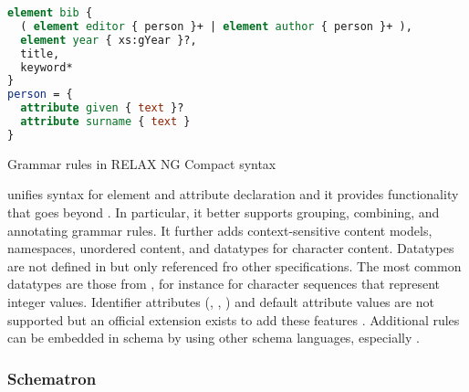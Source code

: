 \begin{example}
\begin{lstlisting}[language=rnc]
element bib {
  ( element editor { person }+ | element author { person }+ ), 
  element year { xs:gYear }?,
  title, 
  keyword*
}
person = { 
  attribute given { text }?
  attribute surname { text }
}
\end{lstlisting}
\caption{Grammar rules in RELAX NG Compact syntax}
\label{ex:rnc}
\end{example}

 unifies syntax for element and attribute declaration and it
provides functionality that goes beyond . In particular, it better
supports grouping, combining, and annotating grammar rules. It further adds
context-sensitive content models, namespaces, unordered content, and datatypes
for character content.  Datatypes are not defined in  but only
referenced fro  other specifications. The most common datatypes are those from
, for instance  for character sequences that
represent integer values.  Identifier attributes (, ,
) and default attribute values are not supported but an official
extension exists to add these features \cite{Clark2001}. Additional rules can
be embedded in  schema by using other schema languages,
especially .


\subsubsection{Schematron}

